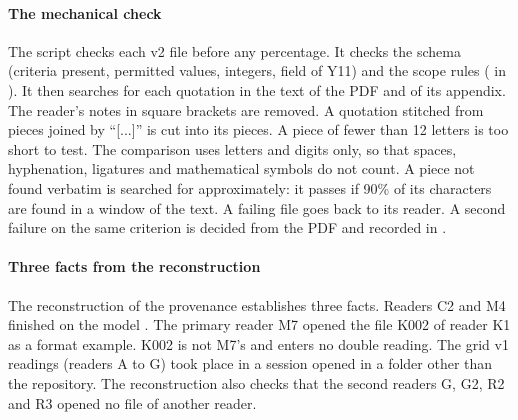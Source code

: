 \paragraph{The mechanical check}
The script  checks each v2 file before any percentage. It checks the schema
(criteria present, permitted values, integers,  field of Y11) and the scope rules
( in ). It then searches for each quotation in the text of
the PDF and of its appendix. The reader's notes in square brackets are removed. A quotation stitched from
pieces joined by \enquote{[...]} is cut into its pieces. A piece of fewer than 12 letters is too
short to test. The comparison uses letters and digits only, so that spaces, hyphenation, ligatures and
mathematical symbols do not count. A piece not found verbatim is searched for approximately: it passes
if 90\% of its characters are found in a window of the text. A failing file goes back to its reader. A
second failure on the same criterion is decided from the PDF and recorded in
.

\paragraph{Three facts from the reconstruction}
The reconstruction of the provenance establishes three facts. Readers C2 and
M4 finished on the model . The primary reader M7 opened the file K002 of reader K1
as a format example. K002 is not M7's and enters no double reading. The grid v1 readings (readers A to
G) took place in a session opened in a folder other than the repository. The reconstruction
also checks that the second readers G, G2, R2 and R3 opened no file of another reader.

